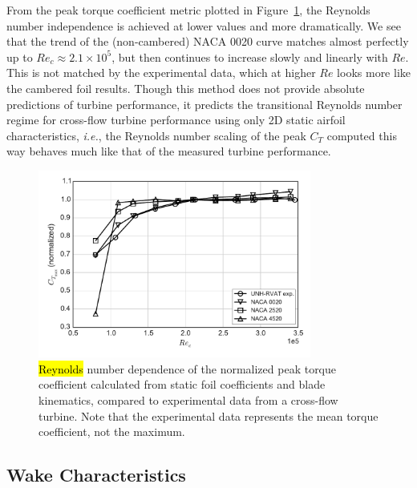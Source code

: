 \documentclass[energies,article,accept,moreauthors,pdftex,10pt,a4paper]{mdpi}
\theoremstyle{mdpi}
\newcounter{ex}
\newcounter{re}
\begin{document}
From the peak torque coefficient metric plotted in
Figure~\ref{fig:foils-C_T-Re-dep}, the Reynolds number independence is achieved
at lower values and more dramatically. We see that the trend of the
(non-cambered) NACA 0020 curve matches almost perfectly up to $Re_c \approx 2.1
\times 10^5$, but then continues to increase slowly and linearly with $Re$. This
is not matched by the experimental data, which at higher $Re$ looks more like
the cambered foil results. Though this method does not provide absolute
predictions of turbine performance, it predicts the transitional Reynolds number
regime for cross-flow turbine performance using only 2D static airfoil
characteristics, \emph{i.e.}, the Reynolds number scaling of the peak $C_T$ computed this
way behaves much like that of the measured turbine performance.

\begin{figure}[H]
\centering

\includegraphics[width=0.8\textwidth]{figures/cft_re_dep_foils}

\caption{\hl {Reynolds} number dependence of the normalized peak torque coefficient
 calculated from static foil coefficients and blade kinematics, compared to
 experimental data from a cross-flow turbine. Note that the experimental data
 represents the mean torque coefficient, not the maximum.}

\label{fig:foils-C_T-Re-dep}
\end{figure}


\subsection{Wake Characteristics}
\end{document}
